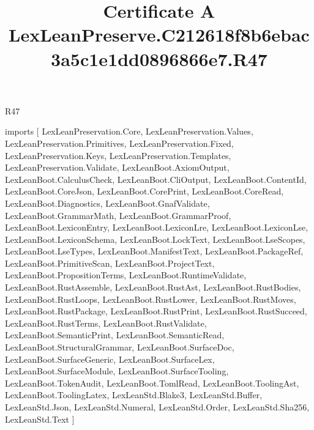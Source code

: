 \begin{lexlean}{R47}
\title{Certificate A LexLeanPreserve.C212618f8b6ebac3a5c1e1dd0896866e7.R47}
\begin{coremodule}
imports [
  LexLeanPreservation.Core,
  LexLeanPreservation.Values,
  LexLeanPreservation.Primitives,
  LexLeanPreservation.Fixed,
  LexLeanPreservation.Keys,
  LexLeanPreservation.Templates,
  LexLeanPreservation.Validate,
  LexLeanBoot.AxiomOutput,
  LexLeanBoot.CalculusCheck,
  LexLeanBoot.CliOutput,
  LexLeanBoot.ContentId,
  LexLeanBoot.CoreJson,
  LexLeanBoot.CorePrint,
  LexLeanBoot.CoreRead,
  LexLeanBoot.Diagnostics,
  LexLeanBoot.GnafValidate,
  LexLeanBoot.GrammarMath,
  LexLeanBoot.GrammarProof,
  LexLeanBoot.LexiconEntry,
  LexLeanBoot.LexiconLre,
  LexLeanBoot.LexiconLse,
  LexLeanBoot.LexiconSchema,
  LexLeanBoot.LockText,
  LexLeanBoot.LseScopes,
  LexLeanBoot.LseTypes,
  LexLeanBoot.ManifestText,
  LexLeanBoot.PackageRef,
  LexLeanBoot.PrimitiveScan,
  LexLeanBoot.ProjectText,
  LexLeanBoot.PropositionTerms,
  LexLeanBoot.RuntimeValidate,
  LexLeanBoot.RustAssemble,
  LexLeanBoot.RustAst,
  LexLeanBoot.RustBodies,
  LexLeanBoot.RustLoops,
  LexLeanBoot.RustLower,
  LexLeanBoot.RustMoves,
  LexLeanBoot.RustPackage,
  LexLeanBoot.RustPrint,
  LexLeanBoot.RustSucceed,
  LexLeanBoot.RustTerms,
  LexLeanBoot.RustValidate,
  LexLeanBoot.SemanticPrint,
  LexLeanBoot.SemanticRead,
  LexLeanBoot.StructuralGrammar,
  LexLeanBoot.SurfaceDoc,
  LexLeanBoot.SurfaceGeneric,
  LexLeanBoot.SurfaceLex,
  LexLeanBoot.SurfaceModule,
  LexLeanBoot.SurfaceTooling,
  LexLeanBoot.TokenAudit,
  LexLeanBoot.TomlRead,
  LexLeanBoot.ToolingAst,
  LexLeanBoot.ToolingLatex,
  LexLeanStd.Blake3,
  LexLeanStd.Buffer,
  LexLeanStd.Json,
  LexLeanStd.Numeral,
  LexLeanStd.Order,
  LexLeanStd.Sha256,
  LexLeanStd.Text
]


\end{coremodule}
\end{lexlean}
